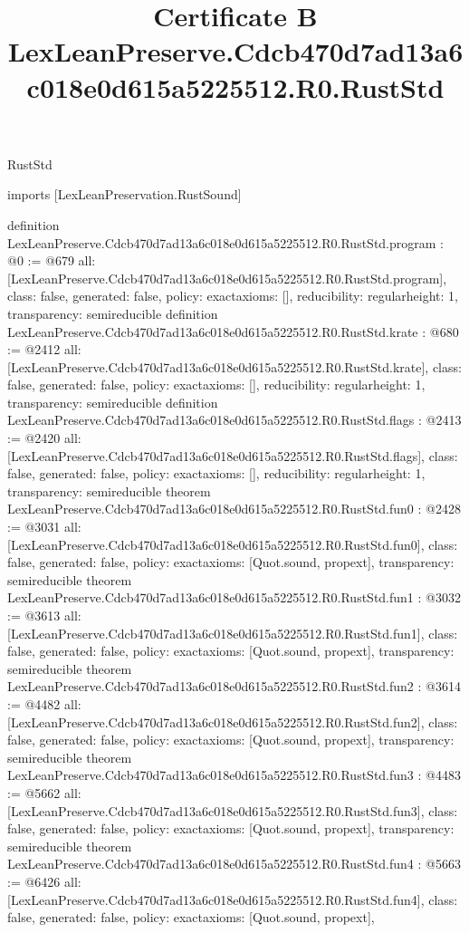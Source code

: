 \begin{lexlean}{RustStd}
\title{Certificate B LexLeanPreserve.Cdcb470d7ad13a6c018e0d615a5225512.R0.RustStd}
\begin{coremodule}
imports [LexLeanPreservation.RustSound]

definition LexLeanPreserve.Cdcb470d7ad13a6c018e0d615a5225512.R0.RustStd.program : @0 := @679 {
  all: [LexLeanPreserve.Cdcb470d7ad13a6c018e0d615a5225512.R0.RustStd.program],
  class: false,
  generated: false,
  policy: exact{axioms: []},
  reducibility: regular{height: 1},
  transparency: semireducible
}
definition LexLeanPreserve.Cdcb470d7ad13a6c018e0d615a5225512.R0.RustStd.krate : @680 := @2412 {
  all: [LexLeanPreserve.Cdcb470d7ad13a6c018e0d615a5225512.R0.RustStd.krate],
  class: false,
  generated: false,
  policy: exact{axioms: []},
  reducibility: regular{height: 1},
  transparency: semireducible
}
definition LexLeanPreserve.Cdcb470d7ad13a6c018e0d615a5225512.R0.RustStd.flags : @2413 := @2420 {
  all: [LexLeanPreserve.Cdcb470d7ad13a6c018e0d615a5225512.R0.RustStd.flags],
  class: false,
  generated: false,
  policy: exact{axioms: []},
  reducibility: regular{height: 1},
  transparency: semireducible
}
theorem LexLeanPreserve.Cdcb470d7ad13a6c018e0d615a5225512.R0.RustStd.fun0 : @2428 := @3031 {
  all: [LexLeanPreserve.Cdcb470d7ad13a6c018e0d615a5225512.R0.RustStd.fun0],
  class: false,
  generated: false,
  policy: exact{axioms: [Quot.sound, propext]},
  transparency: semireducible
}
theorem LexLeanPreserve.Cdcb470d7ad13a6c018e0d615a5225512.R0.RustStd.fun1 : @3032 := @3613 {
  all: [LexLeanPreserve.Cdcb470d7ad13a6c018e0d615a5225512.R0.RustStd.fun1],
  class: false,
  generated: false,
  policy: exact{axioms: [Quot.sound, propext]},
  transparency: semireducible
}
theorem LexLeanPreserve.Cdcb470d7ad13a6c018e0d615a5225512.R0.RustStd.fun2 : @3614 := @4482 {
  all: [LexLeanPreserve.Cdcb470d7ad13a6c018e0d615a5225512.R0.RustStd.fun2],
  class: false,
  generated: false,
  policy: exact{axioms: [Quot.sound, propext]},
  transparency: semireducible
}
theorem LexLeanPreserve.Cdcb470d7ad13a6c018e0d615a5225512.R0.RustStd.fun3 : @4483 := @5662 {
  all: [LexLeanPreserve.Cdcb470d7ad13a6c018e0d615a5225512.R0.RustStd.fun3],
  class: false,
  generated: false,
  policy: exact{axioms: [Quot.sound, propext]},
  transparency: semireducible
}
theorem LexLeanPreserve.Cdcb470d7ad13a6c018e0d615a5225512.R0.RustStd.fun4 : @5663 := @6426 {
  all: [LexLeanPreserve.Cdcb470d7ad13a6c018e0d615a5225512.R0.RustStd.fun4],
  class: false,
  generated: false,
  policy: exact{axioms: [Quot.sound, propext]},
}
\end{coremodule}
\end{lexlean}
